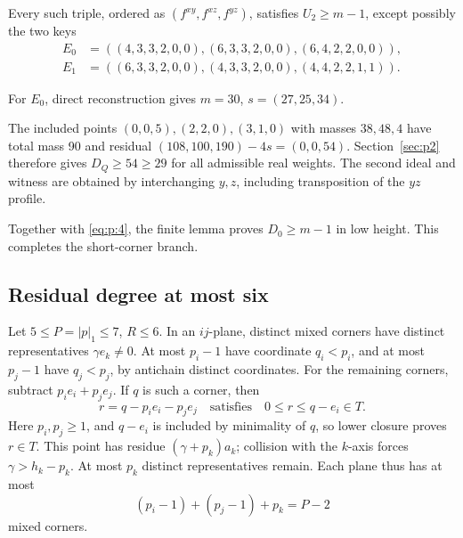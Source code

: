 \begin{finitelemma}\label{finite:short-corner-low}
Every such triple, ordered as \((f^{xy},f^{xz},f^{yz})\), satisfies
\(U_2\ge m-1\), except possibly the two keys
\[
\begin{aligned}
E_0&=((4,3,3,2,0,0),(6,3,3,2,0,0),(6,4,2,2,0,0)),\\
E_1&=((6,3,3,2,0,0),(4,3,3,2,0,0),(4,4,2,2,1,1)).
\end{aligned}
\]

\end{finitelemma}

For \(E_0\), direct reconstruction gives \(m=30\), \(s=(27,25,34)\).

The included points \((0,0,5),(2,2,0),(3,1,0)\) with masses \(38,48,4\)
have total mass 90 and residual
\((108,100,190)-4s=(0,0,54)\).
Section~\ref{sec:p2} therefore gives \(D_Q\ge54\ge29\) for all admissible real weights.
The second ideal and witness are obtained by interchanging \(y,z\),
including transposition of the \(yz\) profile.

Together with \eqref{eq:p:4}, the finite lemma proves \(D_0\ge m-1\) in low height.
This completes the short-corner branch.

\subsection{Residual degree at most six}\label{sec:p10}

Let \(5\le P=|p|_1\le7\), \(R\le6\).
In an \(ij\)-plane, distinct mixed corners have distinct representatives
\(\gamma e_k\ne0\). At most \(p_i-1\) have coordinate \(q_i<p_i\),
and at most \(p_j-1\) have \(q_j<p_j\), by antichain distinct coordinates.
For the remaining corners, subtract \(p_ie_i+p_je_j\).
If \(q\) is such a corner, then
\[
r=q-p_ie_i-p_je_j\quad\text{satisfies}\quad
0\le r\le q-e_i\in T.
\]
Here \(p_i,p_j\ge1\), and \(q-e_i\) is included by minimality of \(q\),
so lower closure proves \(r\in T\). This point has residue
\((\gamma+p_k)a_k\);
collision with the \(k\)-axis forces \(\gamma>h_k-p_k\).
At most \(p_k\) distinct representatives remain. Each plane thus has at most
\begin{equation}
(p_i-1)+(p_j-1)+p_k=P-2
\label{eq:p:19}
\end{equation}
mixed corners.

